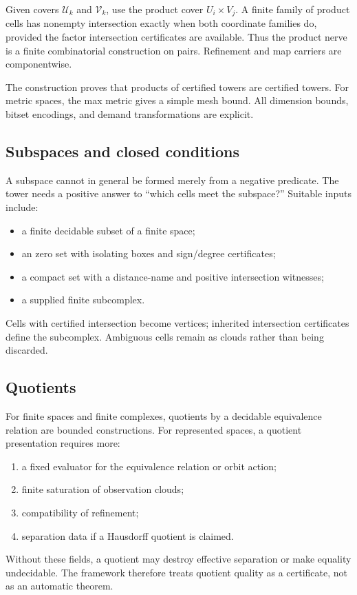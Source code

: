 Given covers $\mathcal U_k$ and $\mathcal V_k$, use the product cover $U_i\times V_j$.  A finite family of product cells has nonempty intersection exactly when both coordinate families do, provided the factor intersection certificates are available.  Thus the product nerve is a finite combinatorial construction on pairs.  Refinement and map carriers are componentwise.

The construction proves that products of certified towers are certified towers.  For metric spaces, the max metric gives a simple mesh bound.  All dimension bounds, bitset encodings, and demand transformations are explicit.

\subsection{Subspaces and closed conditions}

A subspace cannot in general be formed merely from a negative predicate.  The tower needs a positive answer to ``which cells meet the subspace?''  Suitable inputs include:
\begin{itemize}
  \item a finite decidable subset of a finite space;
  \item an zero set with isolating boxes and sign/degree certificates;
  \item a compact set with a distance-name and positive intersection witnesses;
  \item a supplied finite subcomplex.
\end{itemize}
Cells with certified intersection become vertices; inherited intersection certificates define the subcomplex.  Ambiguous cells remain as clouds rather than being discarded.

\subsection{Quotients}

For finite spaces and finite complexes, quotients by a decidable equivalence relation are bounded constructions.  For represented spaces, a quotient presentation requires more:
\begin{enumerate}
  \item a fixed evaluator for the equivalence relation or orbit action;
  \item finite saturation of observation clouds;
  \item compatibility of refinement;
  \item separation data if a Hausdorff quotient is claimed.
\end{enumerate}
Without these fields, a quotient may destroy effective separation or make equality undecidable.  The framework therefore treats quotient quality as a certificate, not as an automatic theorem.

